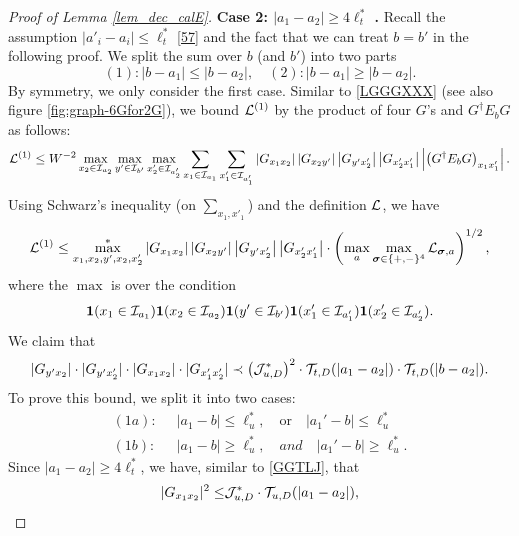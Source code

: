 \documentclass[10pt,reqno]{article}
\theoremstyle{plain} %
\theoremstyle{remark}
\numberwithin{equation}{section}
\begin{document}
\begin{proof}[Proof of Lemma \ref{lem_dec_calE}]
 \noindent 
{\bf Case 2: $|a_1-a_2|\ge 4\ell_t^*$ .} 
Recall  the assumption  $|a'_i-a_i|\le \ell_t^*$ \eqref{57} and the fact  that we can treat $b=b'$  in the following proof.  
We  split the sum over $b$ (and $b'$) into two parts 
$$
(1): |b -a_1|\le |b-a_2|,\quad (2): |b-a_1|\ge |b-a_2|.
$$
By symmetry, we only consider  the first case.   Similar to \eqref{LGGGXXX} (see also figure \ref{fig:graph-6Gfor2G}), we  bound ${\cal L}^{(1)}$ by the product of four $G$'s and  $G^\dagger E_b G$ as follows: 
\begin{align} 
{\cal L}^{(1)}\le W^{-2}   \max_{ x_2\in {\cal I}_{a _2}}\max_{ y'\in {\cal I}_{b'}}\max_{x_2'\in {\cal I}_{a'_2}} \sum_{x_1\in {\cal I}_{a_1}}\sum_{x'_1\in {\cal I}_{a'_1}}
\left|G_{x_1x_2}\right|
\left|G_{x_2y'}\right|
\left|G_{y'x_2'}\right|
\left|G_{ x_2'x_1'}\right|
\left|\left(G^\dagger E_b G\right)_{ x_1x_1'}\right|.
\end{align}
Using Schwarz's inequality (on $\sum_{x_1,x'_1}$) and the definition $\cal L$, we have
\begin{align}\label{L6G6X}
{\cal L}^{(1)}\le \max^*_{ x_1, x_2, y', x_2, x_2'}  
\left|G_{x_1x_2}\right|
\left|G_{x_2y'}\right|
\left|G_{y'x_2'}\right|
\left|G_{ x_2'x_1'}\right|
\cdot \left(\max_{ \textbf{a}}\max_{\boldsymbol{\sigma}\in \{+,-\}^4 }{\cal L} _{\boldsymbol{\sigma}, a}\right)^{1/2}, 
\end{align}
where the $\max $ is over  the condition 
$$
 {\bf 1}(x_1\in {\cal I}_{a_1}){\bf 1}(x_2\in {\cal I}_{a_2}){\bf 1}(y'\in {\cal I}_{b'}){\bf 1}(x'_1\in {\cal I}_{a'_1}){\bf 1}(x'_2\in {\cal I}_{a'_2}).
$$
We claim that 
\begin{align} \label{GGTLJ4G}
|G_{y'x_2}|\cdot |G_{y'x_2'}| 
\cdot 
|G_{x_1x_2}|\cdot |G_{x_1'x_2'}|
\prec 
\left({\cal J}^*_{u,D}\right)^2\cdot 
{\cal T} _{t,D}(|a_1-a_2|)\cdot {\cal T} _{t,D}( |b-a_2|)  .  
\end{align}
To prove this bound, we split it into two cases:  
\begin{align}
(1a): \;&\; |a_1-b|\le \ell_u^*,\quad \text{or}\quad |a_1'-b|\le \ell_u^*\nonumber \\
(1b):   \;&\;  |a_1-b|\ge \ell_u^*,\quad and\quad |a_1'-b|\ge \ell_u^*.
\end{align} 
Since $|a_1-a_2|\ge 4\ell_t^*$, we have,  similar to \eqref{GGTLJ}, that 
\begin{align} 
 |G_{x_1x_2}|^2\le  & {\cal J}^*_{u,D}\cdot {\cal T}_{u,D}(|a_1-a_2|), \\

\end{align}
\end{proof}
\end{document}

